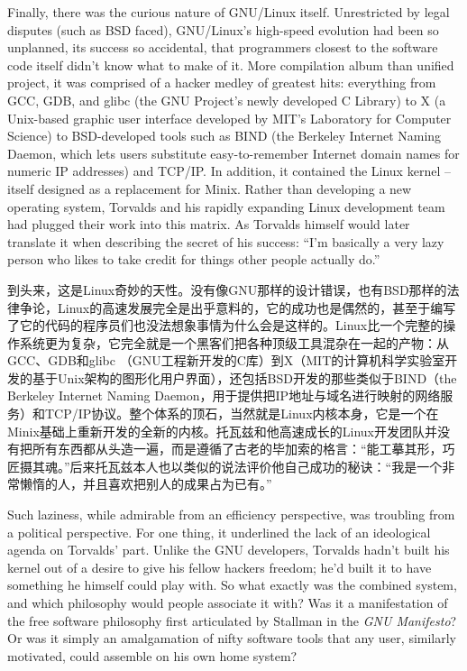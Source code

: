 \ifdefined\eng
Finally, there was the curious nature of GNU/Linux itself. Unrestricted by  legal disputes (such as BSD faced), GNU/Linux's high-speed evolution had been so unplanned, its success so accidental, that programmers closest to the software code itself didn't know what to make of it. More compilation album than unified project, it was comprised of a hacker medley of greatest hits: everything from GCC, GDB, and glibc (the GNU Project's newly developed C Library) to X (a Unix-based graphic user interface developed by MIT's Laboratory for Computer Science) to BSD-developed tools such as BIND (the Berkeley Internet Naming Daemon, which lets users substitute easy-to-remember Internet domain names for numeric IP addresses) and TCP/IP. In addition, it contained the Linux kernel -- itself designed as a replacement for Minix. Rather than developing a new operating system, Torvalds and his rapidly expanding Linux development team had plugged their work into this matrix.  As Torvalds himself would later translate it when describing the secret of his success: ``I'm basically a very lazy person who likes to take credit for things other people actually do.''
\fi

\ifdefined\chs
到头来，这是Linux奇妙的天性。没有像GNU那样的设计错误，也有BSD那样的法律争论，Linux的高速发展完全是出乎意料的，它的成功也是偶然的，甚至于编写了它的代码的程序员们也没法想象事情为什么会是这样的。Linux比一个完整的操作系统更为复杂，它完全就是一个黑客们把各种顶级工具混杂在一起的产物：从GCC、GDB和glibc （GNU工程新开发的C库）到X（MIT的计算机科学实验室开发的基于Unix架构的图形化用户界面），还包括BSD开发的那些类似于BIND（the Berkeley Internet Naming Daemon，用于提供把IP地址与域名进行映射的网络服务）和TCP/IP协议。整个体系的顶石，当然就是Linux内核本身，它是一个在Minix基础上重新开发的全新的内核。托瓦兹和他高速成长的Linux开发团队并没有把所有东西都从头造一遍，而是遵循了古老的毕加索的格言：``能工摹其形，巧匠摄其魂。''后来托瓦兹本人也以类似的说法评价他自己成功的秘诀：``我是一个非常懒惰的人，并且喜欢把别人的成果占为已有。''
\fi

\ifdefined\eng
Such laziness, while admirable from an efficiency perspective, was troubling from a political perspective. For one thing, it underlined the lack of an ideological agenda on Torvalds' part. Unlike the GNU developers, Torvalds hadn't built his kernel out of a desire to give his fellow hackers freedom; he'd built it to have something he himself could play with. So what exactly was the combined system, and which philosophy would people associate it with? Was it a manifestation of the free software philosophy first articulated by Stallman in the \textit{GNU Manifesto}? Or was it simply an amalgamation of nifty software tools that any user, similarly motivated, could assemble on his own home system?
\fi

